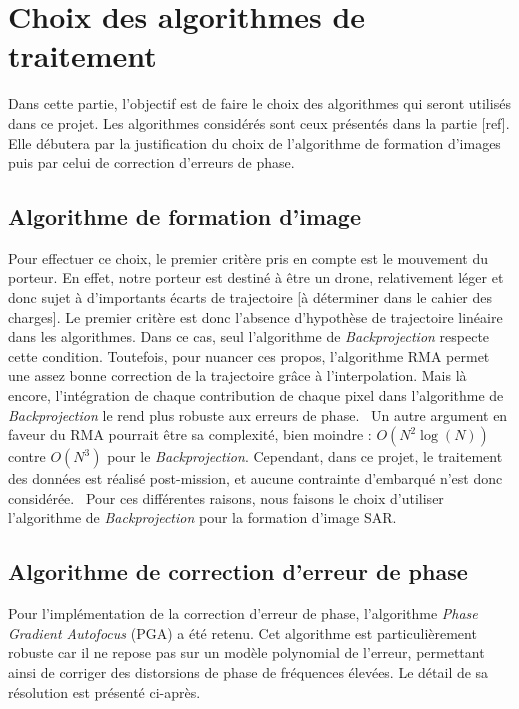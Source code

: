 \section{Choix des algorithmes de traitement}
\label{sec:algo_trait}
Dans cette partie, l'objectif est de faire le choix des algorithmes qui seront utilisés dans ce projet. Les algorithmes considérés sont ceux présentés dans la partie [ref]. Elle débutera par la justification du choix de l'algorithme de formation d'images puis par celui de correction d'erreurs de phase.

\subsection{Algorithme de formation d'image}
\label{subsec:choix_bp}

Pour effectuer ce choix, le premier critère pris en compte est le mouvement du porteur. En effet, notre porteur est destiné à être un drone, relativement léger et donc sujet à d’importants écarts de trajectoire [à déterminer dans le cahier des charges]. Le premier critère est donc l’absence d’hypothèse de trajectoire linéaire dans les algorithmes. Dans ce cas, seul l’algorithme de \textit{Backprojection} respecte cette condition. Toutefois, pour nuancer ces propos, l’algorithme RMA permet une assez bonne correction de la trajectoire grâce à l’interpolation. Mais là encore, l’intégration de chaque contribution de chaque pixel dans l’algorithme de \textit{Backprojection} le rend plus robuste aux erreurs de phase. \
Un autre argument en faveur du RMA pourrait être sa complexité, bien moindre : $O(N^2 \log(N))$ contre $O(N^3)$ pour le \textit{Backprojection}. Cependant, dans ce projet, le traitement des données est réalisé post-mission, et aucune contrainte d’embarqué n’est donc considérée. \
Pour ces différentes raisons, nous faisons le choix d’utiliser l’algorithme de \textit{Backprojection} pour la formation d’image SAR.

\subsection{Algorithme de correction d'erreur de phase}
\label{subsec:choix_pga}

Pour l'implémentation de la correction d'erreur de phase, l'algorithme \textit{Phase Gradient Autofocus} (PGA) a été retenu. Cet algorithme est particulièrement robuste car il ne repose pas sur un modèle polynomial de l'erreur, permettant ainsi de corriger des distorsions de phase de fréquences élevées. Le détail de sa résolution est présenté ci-après.

